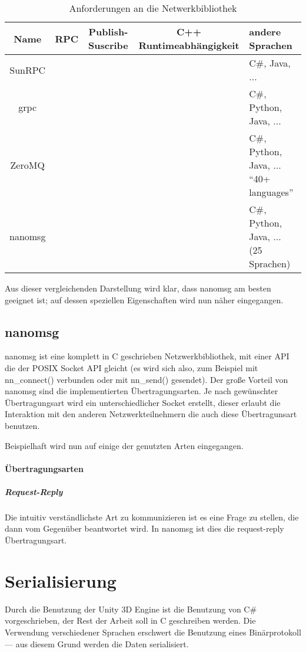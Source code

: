 \documentclass[
    12pt,
    bibliography=totoc,
    ngerman,
    enabledeprecatedfontcommands
]{scrartcl}
\newcommand{\xmark}{\text{\sffamily X}} %
\begin{document}
\clearpage %
\begin{table}[h]
\centering
\begin{tabu}{c | c | c | c | p{5cm}}
	\toprule
	Name & RPC & Publish-Suscribe & C++ Runtimeabh{\"{a}}ngigkeit & andere Sprachen \\
	\midrule
	SunRPC & \checkmark & \xmark & \checkmark & C\#, Java, ... \\
	grpc\cite{grpc} & \checkmark & \xmark & \xmark & C\#, Python, Java, ... \\
	ZeroMQ\cite{zeromq} & \xmark & \checkmark & \xmark & C\#, Python, Java, ... \enquote{40+ languages} \\
	nanomsg\cite{nanomsg} & \xmark & \checkmark & \checkmark & C\#, Python, Java, ... (25 Sprachen) \\
	\bottomrule
\end{tabu}
\caption{Anforderungen an die Netwerkbibliothek}
\end{table}

Aus dieser vergleichenden Darstellung wird klar, dass nanomsg am besten geeignet ist; auf dessen speziellen Eigenschaften wird nun n{\"{a}}her eingegangen.

\subsection{nanomsg}
nanomsg ist eine komplett in C geschrieben Netzwerkbibliothek, mit einer API die der POSIX Socket API gleicht (es wird sich also, zum Beispiel mit nn\_connect() verbunden oder mit nn\_send() gesendet).
Der gro{\ss}e Vorteil von nanomsg sind die implementierten {\"{U}}bertragungsarten. Je nach gew{\"{u}}nschter {\"{U}}bertragungsart wird ein unterschiedlicher Socket erstellt, dieser erlaubt die
Interaktion mit den anderen Netzwerkteilnehmern die auch diese {\"{U}}bertragunsart benutzen.

Beispielhaft wird nun auf einige der genutzten Arten eingegangen.

\paragraph{{\"{U}}bertragungsarten}
\subparagraph{Request-Reply} Die intuitiv verst{\"{a}}ndlichste Art zu kommunizieren ist es eine Frage zu stellen, die dann vom Gegen{\"{u}}ber beantwortet wird. In nanomsg ist dies die request-reply
{\"{U}}bertragungsart.

\clearpage
\section{Serialisierung}
Durch die Benutzung der Unity 3D Engine ist die Benutzung von C\# vorgeschrieben, der Rest der Arbeit soll in C geschreiben werden. Die Verwendung verschiedener Sprachen erschwert die Benutzung eines
Bin{\"{a}}rprotokoll --- aus diesem Grund werden die Daten serialisiert.
\end{document}
